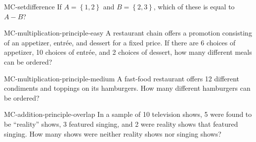 \documentclass[letterpaper]{ngeexam}
\newcommand{\set}[1]{\left\{#1\right\}}
\newcommand{\intersect}{\cap}
\newcommand{\union}{\cup}
\begin{document}
{\begin{question}{MC-setdifference}
    If $A = \set{1,2}$ and $B = \set{2,3}$, which of these is equal to $A-B$?
    \begin{choices}
        \correctchoice{$\set{1}$}     %
        \wrongchoice {$\set{2}$}     %
        \wrongchoice {$\set{-1}$}    %
        \wrongchoice {$\set{-1,-1}$} %
        \wrongchoice {$\set{}$}      %
    \end{choices}
\end{question}

\begin{question}{MC-multiplication-principle-easy}
    A restaurant chain offers a promotion consisting of an appetizer, entr\'ee, 
    and dessert for a fixed price.  If there are 6 choices of appetizer, 10 choices
    of entr\'ee, and 2 choices of dessert, how many different meals can be ordered?
    \begin{choices}
    \end{choices}
\end{question}

\begin{question}{MC-multiplication-principle-medium}
    A fast-food restaurant offers 12 different condiments and toppings on its hamburgers.  How many different hamburgers can be ordered?
    \begin{choices}
    \end{choices}
\end{question}

\begin{question}{MC-addition-principle-overlap}
    In a sample of 10 television shows, 5 were found to be ``reality'' shows, 
    3 featured singing, and 2 were reality shows that featured singing.  
    How many shows were neither reality shows nor singing shows?
    \begin{choices}
    \end{choices}
\end{question}

}
\end{document}
